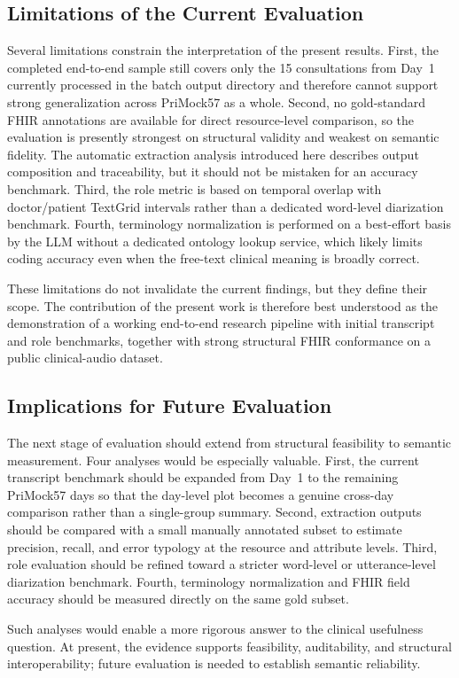 \subsection{Limitations of the Current Evaluation}

Several limitations constrain the interpretation of the present results. First, the completed end-to-end sample still covers only the 15 consultations from Day~1 currently processed in the batch output directory and therefore cannot support strong generalization across PriMock57 as a whole. Second, no gold-standard FHIR annotations are available for direct resource-level comparison, so the evaluation is presently strongest on structural validity and weakest on semantic fidelity. The automatic extraction analysis introduced here describes output composition and traceability, but it should not be mistaken for an accuracy benchmark. Third, the role metric is based on temporal overlap with doctor/patient TextGrid intervals rather than a dedicated word-level diarization benchmark. Fourth, terminology normalization is performed on a best-effort basis by the LLM without a dedicated ontology lookup service, which likely limits coding accuracy even when the free-text clinical meaning is broadly correct.

These limitations do not invalidate the current findings, but they define their scope. The contribution of the present work is therefore best understood as the demonstration of a working end-to-end research pipeline with initial transcript and role benchmarks, together with strong structural FHIR conformance on a public clinical-audio dataset.

\subsection{Implications for Future Evaluation}

The next stage of evaluation should extend from structural feasibility to semantic measurement. Four analyses would be especially valuable. First, the current transcript benchmark should be expanded from Day~1 to the remaining PriMock57 days so that the day-level plot becomes a genuine cross-day comparison rather than a single-group summary. Second, extraction outputs should be compared with a small manually annotated subset to estimate precision, recall, and error typology at the resource and attribute levels. Third, role evaluation should be refined toward a stricter word-level or utterance-level diarization benchmark. Fourth, terminology normalization and FHIR field accuracy should be measured directly on the same gold subset.

Such analyses would enable a more rigorous answer to the clinical usefulness question. At present, the evidence supports feasibility, auditability, and structural interoperability; future evaluation is needed to establish semantic reliability.
